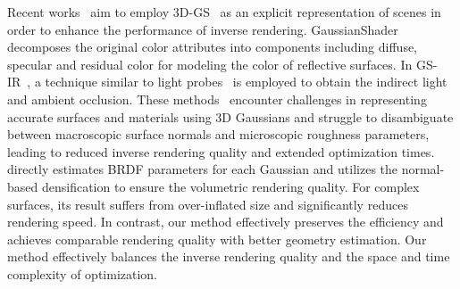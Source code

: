 Recent works~\cite{jiang2024gaussianshader,liang2024gs, gao2023relightable} aim to employ 3D-GS~\cite{kerbl20233d} as an explicit representation of scenes in order to enhance the performance of inverse rendering. GaussianShader~\cite{jiang2024gaussianshader} decomposes the original color attributes into components including diffuse, specular and residual color for modeling the color of reflective surfaces. In GS-IR~\cite{liang2024gs}, a technique similar to light probes~\cite{debevec2008median} is employed to obtain the indirect light and ambient occlusion. These methods~\cite{jiang2024gaussianshader, liang2024gs} encounter challenges in representing accurate surfaces and materials using 3D Gaussians and struggle to disambiguate between macroscopic surface normals and microscopic roughness parameters, leading to reduced inverse rendering quality and extended optimization times. \cite{gao2023relightable} directly estimates BRDF parameters for each Gaussian and utilizes the normal-based densification to ensure the volumetric rendering quality. For complex surfaces, its result suffers from over-inflated size and significantly reduces rendering speed. In contrast, our method effectively preserves the efficiency and achieves comparable rendering quality with better geometry estimation. Our method effectively balances the inverse rendering quality and the space and time complexity of optimization. 



